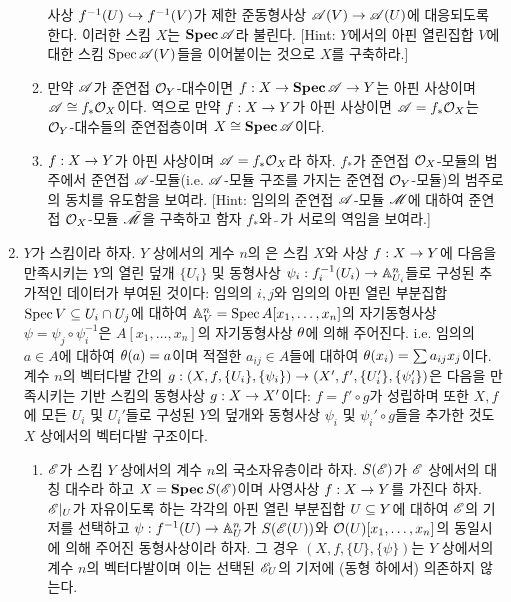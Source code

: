 \begin{enumerate}[label=\tb{5.\arabic*.},itemindent=0mm,itemsep=4mm]
\begin{enumerate}[label=(\alph*)]
		사상 $f^{-1}(U)\hookrightarrow f^{-1}(V)$가 제한 준동형사상 $\mathscr{A}(V)\rightarrow\mathscr{A}(U)$에 대응되도록 한다.
		이러한 스킴 $X$는 $\operatorname{\mathbf{Spec}}\mathscr{A}$라 불린다.
		[Hint: $Y$에서의 아핀 열린집합 $V$에 대한 스킴 $\operatorname{Spec}\mathscr{A}(V)$들을 이어붙이는 것으로 $X$를 구축하라.]
		\item 만약 $\mathscr{A}$가 준연접 $\mathcal{O}_Y$-대수이면 $f:X\rightarrow\operatorname{\mathbf{Spec}}\mathscr{A}\rightarrow Y$는 아핀 사상이며 $\mathscr{A}\cong f_*\mathcal{O}_X$이다.
		역으로 만약 $f:X\rightarrow Y$가 아핀 사상이면 $\mathscr{A}=f_*\mathcal{O}_X$는 $\mathcal{O}_Y$-대수들의 준연접층이며 $X\cong\operatorname{\mathbf{Spec}}\mathscr{A}$이다.
		\item $f:X\rightarrow Y$가 아핀 사상이며 $\mathscr{A}=f_*\mathcal{O}_X$라 하자. $f_*$가 준연접 $\mathcal{O}_X$-모듈의 범주에서
		준연접 $\mathscr{A}$-모듈(i.e. $\mathscr{A}$-모듈 구조를 가지는 준연접 $\mathcal{O}_Y$-모듈)의 범주로의 동치를 유도함을 보여라.
		[Hint: 임의의 준연접 $\mathscr{A}$-모듈 $\mathscr{M}$에 대하여 준연접 $\mathcal{O}_X$-모듈 $\tilde{\mathscr{M}}$을 구축하고
		함자 $f_*$와 $\tilde{\;}$가 서로의 역임을 보여라.]
	\end{enumerate}
	\item {} $Y$가 스킴이라 하자. $Y$ 상에서의 게수 $n$의 은
	스킴 $X$와 사상 $f:X\rightarrow Y$에 다음을 만족시키는 $Y$의 열린 덮개 $\{U_i\}$ 및
	동형사상 $\psi_i:f_i^{-1}(U_i)\rightarrow\mathbb{A}^n_{U_i}$들로 구성된 추가적인 데이터가 부여된 것이다:
	임의의 $i,j$와 임의의 아핀 열린 부분집합 $\operatorname{Spec} V\subseteq U_i\cap U_j$에 대하여
	$\mathbb{A}^n_V=\operatorname{Spec} A[x_1,\ldots,x_n]$의 자기동형사상 $\psi=\psi_j\circ\psi_i^{-1}$은
	$A[x_1,\ldots,x_n]$의  자기동형사상 $\theta$에 의해 주어진다.
	i.e. 임의의 $a\in A$에 대하여 $\theta(a)=a$이며 적절한 $a_{ij}\in A$들에 대하여 $\theta(x_i)=\sum a_{ij}x_j$이다.\\
	계수 $n$의 벡터다발 간의  $g:(X,f,\{U_i\},\{\psi_i\})\rightarrow(X',f',\{U_i'\},\{\psi_i'\})$은
	다음을 만족시키는 기반 스킴의 동형사상 $g:X\rightarrow X'$이다:
	$f=f'\circ g$가 성립하며 또한 $X,f$에 모든 $U_i$ 및 $U_i'$들로 구성된 $Y$의 덮개와
	동형사상 $\psi_i$ 및 $\psi_i'\circ g$들을 추가한 것도 $X$ 상에서의 벡터다발 구조이다.
	\begin{enumerate}[label=(\alph*)]
		\item $\mathscr{E}$가 스킴 $Y$ 상에서의 계수 $n$의 국소자유층이라 하자.
		$S(\mathscr{E})$가 $\mathscr{E}$ 상에서의 대칭 대수라 하고 $X=\operatorname{\mathbf{Spec}} S(\mathscr{E})$이며 사영사상 $f:X\rightarrow Y$를 가진다 하자.
		$\mathscr{E}|_U$가 자유이도록 하는 각각의 아핀 열린 부분집합 $U\subseteq Y$에 대하여 $\mathscr{E}$의 기저를 선택하고
		$\psi:f^{-1}(U)\rightarrow\mathbb{A}^n_U$가 $S(\mathscr{E}(U))$와 $\mathcal{O}(U)[x_1,\ldots,x_n]$의 동일시에 의해 주어진 동형사상이라 하자.
		그 경우 $(X,f,\{U\},\{\psi\})$는 $Y$ 상에서의 계수 $n$의 벡터다발이며 이는 선택된 $\mathscr{E}_U$의 기저에 (동형 하에서) 의존하지 않는다.

\end{enumerate}
\end{enumerate}
